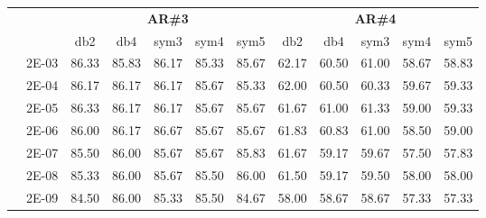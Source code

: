 \begin{table}[H]
\begin{tabular}{|c|c|c c c c c|c c c c c|}
\cline{3-12}
\multicolumn{2}{c}{} & \multicolumn{5}{|c|}{\textbf{AR\#3}}  & \multicolumn{5}{c|}{\textbf{AR\#4}} \\\cline{3-12}
\multicolumn{2}{c}{}  & \multicolumn{1}{|c}{db2} & db4 & sym3 & sym4 & sym5 & db2 & db4& sym3 & sym4 & sym5 \\\hline
\multicolumn{1}{|c|}{ \multirow{6}{*}{\rotatebox[origin=c]{90}{\textbf{Gamma}}} }
&2E-03&	86.33&	85.83&	86.17&	85.33&	85.67&	62.17&	60.50&	61.00&	58.67&	58.83	\\\cline{2-12}
&2E-04&	86.17&	86.17&	86.17&	85.67&	85.33&	62.00&	60.50&	60.33&	59.67&	59.33	\\\cline{2-12}
&2E-05&	86.33&	86.17&	86.17&	85.67&	85.67&	61.67&	61.00&	61.33&	59.00&	59.33	\\\cline{2-12}
&2E-06&	86.00&	86.17&	86.67&	85.67&	85.67&	61.83&	60.83&	61.00&	58.50&	59.00	\\\cline{2-12}
&2E-07&	85.50&	86.00&	85.67&	85.67&	85.83&	61.67&	59.17&	59.67&	57.50&	57.83	\\\cline{2-12}
&2E-08&	85.33&	86.00&	85.67&	85.50&	86.00&	61.50&	59.17&	59.50&	58.00&	58.00	\\\cline{2-12}
&2E-09&	84.50&	86.00&	85.33&	85.50&	84.67&	58.00&	58.67&	58.67&	57.33&	57.33	
\\\midrule
\end{tabular}

\end{table}


